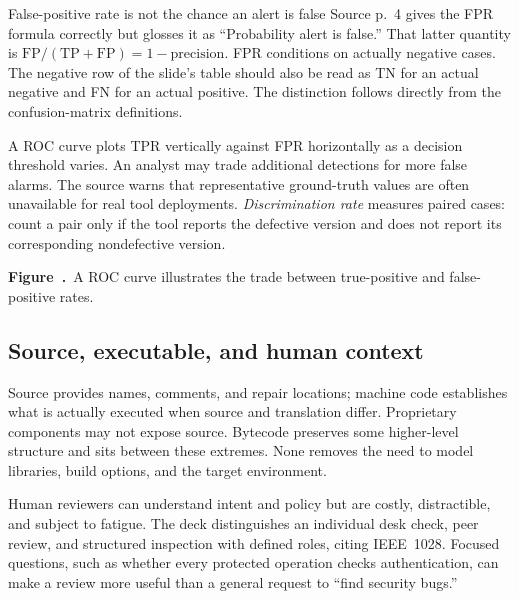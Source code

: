 \documentclass[11pt,a4paper]{article}
\numberwithin{figure}{section}
\newcommand{\diagramcaption}[1]{\par\smallskip\refstepcounter{figure}\begin{center}\small\textbf{Figure~\thefigure.}~#1\end{center}}
\begin{document}
\begin{correction}{False-positive rate is not the chance an alert is false}
Source p.~4 gives the FPR formula correctly but glosses it as ``Probability alert is false.'' That latter quantity is $\mathrm{FP}/(\mathrm{TP}+\mathrm{FP})=1-\mathrm{precision}$. FPR conditions on actually negative cases. The negative row of the slide's table should also be read as TN for an actual negative and FN for an actual positive. The distinction follows directly from the confusion-matrix definitions.
\end{correction}

A ROC curve plots TPR vertically against FPR horizontally as a decision threshold varies. An analyst may trade additional detections for more false alarms. The source warns that representative ground-truth values are often unavailable for real tool deployments. \emph{Discrimination rate} measures paired cases: count a pair only if the tool reports the defective version and does not report its corresponding nondefective version.

\begin{center}\end{center}
\diagramcaption{A ROC curve illustrates the trade between true-positive and false-positive rates.}

\subsection{Source, executable, and human context}
Source provides names, comments, and repair locations; machine code establishes what is actually executed when source and translation differ. Proprietary components may not expose source. Bytecode preserves some higher-level structure and sits between these extremes. None removes the need to model libraries, build options, and the target environment.

Human reviewers can understand intent and policy but are costly, distractible, and subject to fatigue. The deck distinguishes an individual desk check, peer review, and structured inspection with defined roles, citing IEEE~1028. Focused questions, such as whether every protected operation checks authentication, can make a review more useful than a general request to ``find security bugs.''
\end{document}
